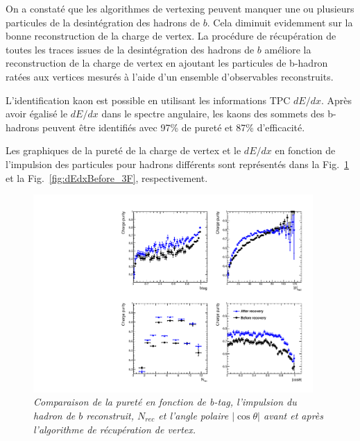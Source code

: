 On a constaté que les algorithmes de vertexing peuvent manquer une ou plusieurs particules de la desintégration des hadrons de $b$. Cela  diminuit evidemment sur la bonne reconstruction de  la charge de vertex.
La procédure de récupération de toutes les traces issues de la desintégration des hadrons de $b$  améliore la reconstruction de la charge de vertex en ajoutant les particules de b-hadron ratées aux vertices mesurés à l'aide d'un ensemble d'observables reconstruits.

L'identification kaon est possible en utilisant les informations TPC $dE/dx$. Après avoir égalisé le $dE/dx$ dans le spectre angulaire, les kaons des sommets des b-hadrons peuvent être identifiés avec 97\% de pureté et 87\% d'efficacité.

Les graphiques de la pureté de la charge de vertex et le $dE/dx$ en fonction de l'impulsion des particules pour hadrons différents sont représentés dans la Fig.~\ref{fig:RecoveryPurityComparison_3F} et la Fig.~\ref{fig:dEdxBefore_3F}, respectivement.

\begin{figure}
	{\centering
		\includegraphics[width=0.95\textwidth]{ILD/plots/recovery-purity-comparison.pdf}
		\caption{\sl Comparaison de la pureté en fonction de b-tag, l'impulsion du hadron de $b$ reconstruit, $N_ {rec}$ et l'angle polaire $|\cos\theta|$ avant et après l'algorithme de récupération de vertex. 
		}
		\label{fig:RecoveryPurityComparison_3F}
	}
\end{figure}

